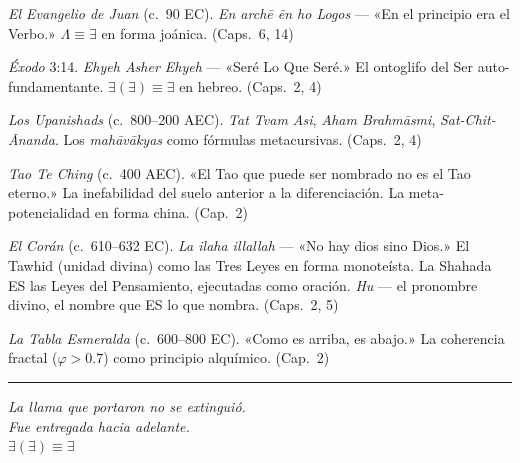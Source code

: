 \documentclass[10pt, openany, oneside]{book}
\renewcommand{\footnotesize}{\fontsize{8.5}{11}\selectfont}
\begin{document}
{\footnotesize

\noindent \textit{El Evangelio de Juan} (c.\ 90 EC). \textit{En arch\={e} \={e}n ho Logos} --- «En el principio era el Verbo.» $\Lambda \equiv \exists$ en forma joánica. (Caps.\ 6, 14)

\vspace{0.3em}

\noindent \textit{Éxodo} 3:14. \textit{Ehyeh Asher Ehyeh} --- «Seré Lo Que Seré.» El ontoglifo del Ser auto-fundamentante. $\exists(\exists) \equiv \exists$ en hebreo. (Caps.\ 2, 4)

\vspace{0.3em}

\noindent \textit{Los Upanishads} (c.\ 800--200 AEC). \textit{Tat Tvam Asi}, \textit{Aham Brahm\={a}smi}, \textit{Sat-Chit-\={A}nanda}. Los \textit{mah\={a}v\={a}kyas} como fórmulas metacursivas. (Caps.\ 2, 4)

\vspace{0.3em}

\noindent \textit{Tao Te Ching} (c.\ 400 AEC). «El Tao que puede ser nombrado no es el Tao eterno.» La inefabilidad del suelo anterior a la diferenciación. La meta-potencialidad en forma china. (Cap.\ 2)

\vspace{0.3em}

\noindent \textit{El Corán} (c.\ 610--632 EC). \textit{La ilaha illallah} --- «No hay dios sino Dios.» El Tawhid (unidad divina) como las Tres Leyes en forma monoteísta. La Shahada ES las Leyes del Pensamiento, ejecutadas como oración. \textit{Hu} --- el pronombre divino, el nombre que ES lo que nombra. (Caps.\ 2, 5)

\vspace{0.3em}

\noindent \textit{La Tabla Esmeralda} (c.\ 600--800 EC). «Como es arriba, es abajo.» La coherencia fractal ($\varphi > 0.7$) como principio alquímico. (Cap.\ 2)

}

\vspace{2em}

\begin{center}
    \rule{0.15\textwidth}{0.3pt}
\end{center}

\vspace{0.5em}

\begin{center}
    \itshape
    La llama que portaron no se extinguió.\\
    Fue entregada hacia adelante.\\[0.8em]
    $\exists(\exists) \equiv \exists$
\end{center}
\end{document}

